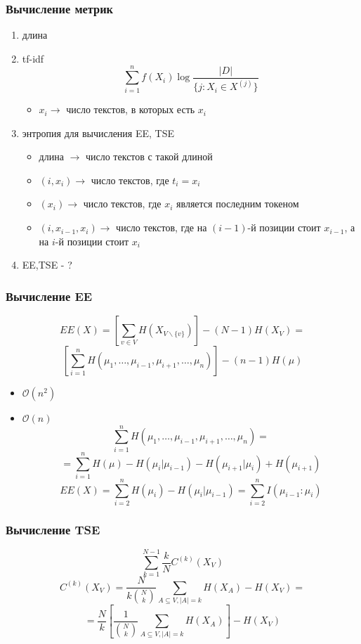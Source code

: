 \documentclass{beamer}
\begin{document}
\begin{frame}
	\frametitle{Вычисление метрик}
	\begin{enumerate}
		\item длина
		\item tf-idf
			\[\sum\limits_{i=1}^{n}f(X_i)\log\frac{|D|}{\{j:X_i\in X^{(j)}\}}\]
			\begin{itemize}
				\item $x_i \rightarrow$ число текстов, в которых есть $x_i$
			\end{itemize}
		\item энтропия для вычисления EE, TSE
			\begin{itemize}
				\item длина $\rightarrow$ число текстов с такой длиной
				\item $(i, x_i) \rightarrow$ число текстов, где $t_i = x_i$ 
				\item $(x_i)\rightarrow$ число текстов, где $x_i$ является последним токеном
				\item $(i, x_{i-1}, x_i) \rightarrow$ число текстов, где на $(i-1)$-й позиции стоит $x_{i-1}$, а на $i$-й позиции стоит $x_i$
			\end{itemize}
		\item EE,TSE - ?
	\end{enumerate}
\end{frame}

\begin{frame}
	\frametitle{Вычисление EE}
	\[
		EE(X) = \left[\sum\limits_{v\in V}H(X_{V\backslash\{v\}})\right] - (N - 1)H(X_V) = 
	\]
	\[
		\left[\sum\limits_{i=1}^{n}H(\mu_1,\ldots,\mu_{i-1},\mu_{i+1},\ldots,\mu_n)\right] - (n - 1)H(\mu)
	\]
	\begin{itemize}
		\item $\mathcal{O}(n^2)$
		\item $\mathcal{O}(n)$
			\[
				\sum\limits_{i=1}^{n}H(\mu_1,\ldots,\mu_{i-1},\mu_{i+1},\ldots,\mu_n) =\]
			\[ = \sum\limits_{i=1}^{n}H(\mu) - H(\mu_i|\mu_{i-1}) - H(\mu_{i+1}|\mu_i) + H(\mu_{i+1})\]
			\[
				EE(X) = \sum\limits_{i=2}^{n}H(\mu_i) - H(\mu_i|\mu_{i-1})= \sum\limits_{i=2}^{n}I(\mu_{i-1}\colon\mu_i)
			\]
	\end{itemize}
\end{frame}

\begin{frame}
	\frametitle{Вычисление TSE}
	\[
		\sum\limits_{k=1}^{N-1}\frac{k}{N}C^{(k)}(X_V)
	\]
	\[
	 	C^{(k)}(X_V) = \frac{N}{k\binom{N}{k}}\sum\limits_{A\subseteq V,|A|=k}H(X_A) - H(X_V) =
 	\]
 	\[
 		= \frac{N}{k}\left[\frac{1}{\binom{N}{k}}\sum\limits_{A\subseteq V,|A|=k}H(X_A)\right] - H(X_V)
	\]
\end{frame}
\end{document}
